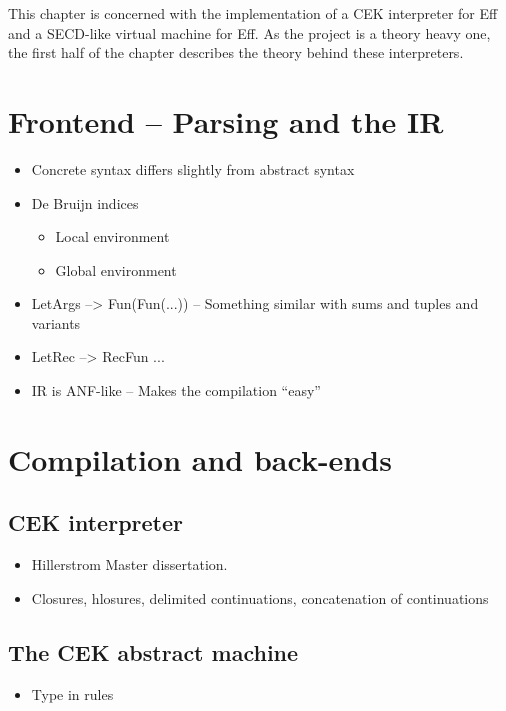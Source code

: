 \documentclass[class=article, crop=false]{standalone}
\begin{document}
This chapter is concerned with the implementation of a CEK interpreter for Eff and
a SECD-like virtual machine for Eff. As the project is a theory heavy one, the first
half of the chapter describes the theory behind these interpreters.

\section{Frontend -- Parsing and the IR}

\begin{itemize}
\item Concrete syntax differs slightly from abstract syntax
\item De Bruijn indices
\begin{itemize}
    \item Local environment
    \item Global environment
\end{itemize}
\item LetArgs --> Fun(Fun(...)) -- Something similar with sums and tuples and variants
\item LetRec --> RecFun ...
\item IR is ANF-like -- Makes the compilation ``easy''
\end{itemize}

\section{Compilation and back-ends}

\subsection{CEK interpreter}

\begin{itemize}
    \item Hillerstrom Master dissertation.
    \item Closures, hlosures, delimited continuations, concatenation of continuations
\end{itemize}

\subsection{The CEK abstract machine}

\begin{itemize}
    \item Type in rules
\end{itemize}
\end{document}
